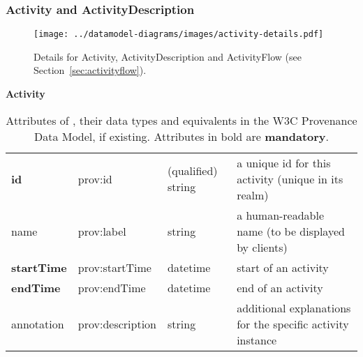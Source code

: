 
\subsubsection{Activity and ActivityDescription}

\begin{figure}[h]
\centering
\texttt{[image: ../datamodel-diagrams/images/activity-details.pdf]}
\caption{Details for Activity, ActivityDescription and ActivityFlow (see Section~\ref{sec:activityflow}). 
}
\label{fig:activity-details}
\end{figure}

\begin{table}[h]

\small
{}\textwidth

\textbf{\normalsize Activity}\vspace{0.25em}\\
\begin{tabulary}{1.0\textwidth}{@{}lp{2.5cm}p{2cm}L@{}}
\toprule
{} &  &  & \\
\midrule
\textbf{id} & prov:id  & (qualified) string & a unique id for this activity (unique in its realm)\\
name        & prov:label  & string & a human-readable name (to be displayed by clients)\\
\textbf{startTime} & prov:startTime & datetime & start of an activity\\
\textbf{endTime} & prov:endTime  & datetime & end of an activity\\
annotation        & prov:description & string & additional explanations for the specific activity instance\\
\bottomrule
\end{tabulary}
\caption{Attributes of , their data types and equivalents in the W3C Provenance 
Data Model, if existing. Attributes in bold are \textbf{mandatory}.}
\end{table}


